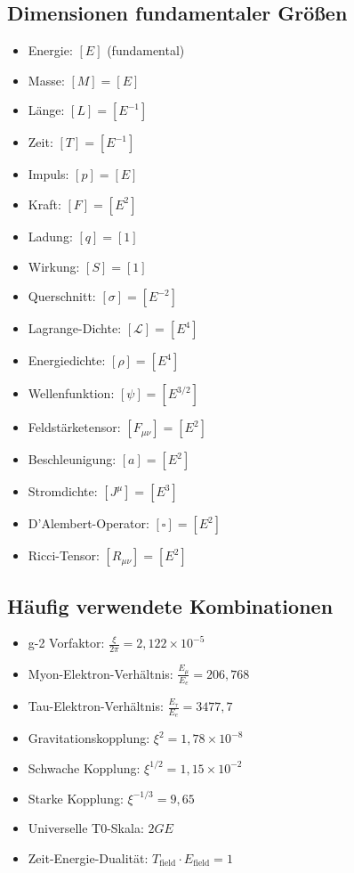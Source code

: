 \documentclass[12pt,a4paper]{article}
\begin{document}
	\subsection{Dimensionen fundamentaler Gr\"{o}\ss{}en}
	\begin{itemize}
		\item Energie: $[E]$ (fundamental)
		\item Masse: $[M] = [E]$
		\item L\"{a}nge: $[L] = [E^{-1}]$
		\item Zeit: $[T] = [E^{-1}]$
		\item Impuls: $[p] = [E]$
		\item Kraft: $[F] = [E^2]$
		\item Ladung: $[q] = [1]$
		\item Wirkung: $[S] = [1]$
		\item Querschnitt: $[\sigma] = [E^{-2}]$
		\item Lagrange-Dichte: $[\mathcal{L}] = [E^4]$
		\item Energiedichte: $[\rho] = [E^4]$
		\item Wellenfunktion: $[\psi] = [E^{3/2}]$
		\item Feldst\"{a}rketensor: $[F_{\mu\nu}] = [E^2]$
		\item Beschleunigung: $[a] = [E^2]$
		\item Stromdichte: $[J^\mu] = [E^3]$
		\item D'Alembert-Operator: $[\square] = [E^2]$
		\item Ricci-Tensor: $[R_{\mu\nu}] = [E^2]$
	\end{itemize}
	
	\subsection{H\"{a}ufig verwendete Kombinationen}
	\begin{itemize}
		\item g-2 Vorfaktor: $\frac{\xi}{2\pi} = 2,122 \times 10^{-5}$
		\item Myon-Elektron-Verh\"{a}ltnis: $\frac{E_\mu}{E_e} = 206,768$
		\item Tau-Elektron-Verh\"{a}ltnis: $\frac{E_\tau}{E_e} = 3477,7$
		\item Gravitationskopplung: $\xi^2 = 1,78 \times 10^{-8}$
		\item Schwache Kopplung: $\xi^{1/2} = 1,15 \times 10^{-2}$
		\item Starke Kopplung: $\xi^{-1/3} = 9,65$
		\item Universelle T0-Skala: $2GE$
		\item Zeit-Energie-Dualit\"{a}t: $T_{\text{field}} \cdot E_{\text{field}} = 1$
	\end{itemize}
	
\end{document}
